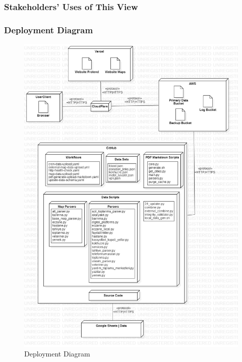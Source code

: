 \subsubsection{Stakeholders' Uses of This View}

\subsubsection{Deployment Diagram}

\begin{figure}[H]
  \centering
  \includegraphics[width=\linewidth]{img/deployment-diagram.jpg}
  \caption{Deployment Diagram}
\end{figure}

